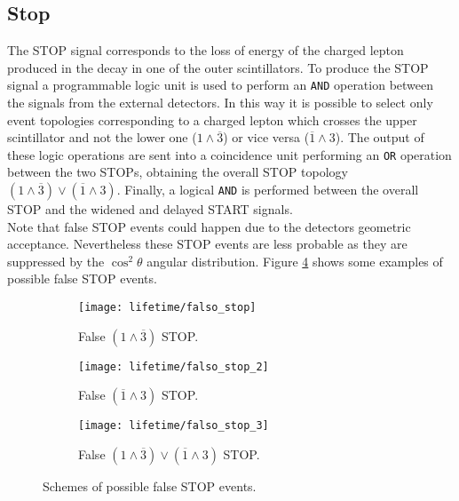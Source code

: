\subsection{Stop} 
The STOP signal corresponds to the loss of energy of the charged lepton produced in the decay in one of the outer scintillators. To produce the STOP signal a programmable logic unit is used to perform an \texttt{AND} operation between the signals from the external detectors. In this way it is possible to select only event topologies corresponding to a charged lepton which crosses the upper scintillator and not the lower one ($1 \wedge \overline 3$) or vice versa ($\overline 1 \wedge 3$). The output of these logic operations are sent into a coincidence unit performing an \texttt{OR} operation between the two STOPs, obtaining the overall STOP topology $ (1 \land \overline 3) \lor (\overline 1 \land 3) $.
Finally, a logical \texttt{AND} is performed between the overall STOP and the widened and delayed START signals.\\
Note that false STOP events could happen due to the detectors geometric acceptance. Nevertheless these STOP events are less probable as they are suppressed by the $\cos^{2} \theta$ angular distribution. Figure \ref{false_stop_events} shows some examples of possible false STOP events.


\begin{figure}[!thp]
	\centering
	\begin{subfigure}{.26\linewidth}
		\centering
		\texttt{[image: lifetime/falso\_stop]}
		\caption{False $ (1 \land \overline 3)$ STOP.}
		\label{false_stop}
	\end{subfigure}
	\begin{subfigure}{.26\linewidth}
		\centering
		\texttt{[image: lifetime/falso\_stop\_2]}
		\caption{False $ (\overline 1 \land  3)$ STOP.}
		\label{false_stop_2}
	\end{subfigure}
	\begin{subfigure}{.26\linewidth}
		\centering
		\texttt{[image: lifetime/falso\_stop\_3]}
		\caption{False $ (1 \land \overline 3) \lor (\overline 1 \land 3) $ STOP.}
		\label{false_stop_3}
	\end{subfigure}
	\caption{Schemes of possible false STOP events.}\label{false_stop_events}
\end{figure}

